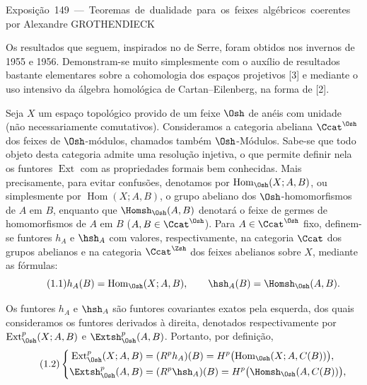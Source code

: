 \unit{Exposição 149 — Teoremas de dualidade para os feixes algébricos coerentes}
%
  {por Alexandre GROTHENDIECK}

Os resultados que seguem, inspirados no 
de Serre, foram obtidos nos invernos de 1955 e 1956. Demonstram-se muito
simplesmente com o auxílio de resultados bastante elementares sobre a cohomologia dos espaços
projetivos [3] e mediante o uso intensivo da álgebra homológica de
Cartan--Eilenberg, na forma de [2].


Seja $X$ um espaço topológico provido de um feixe $\Osh$ de anéis com unidade
(não necessariamente comutativos). Consideramos a categoria abeliana
$\Ccat^{\Osh}$ dos feixes de $\Osh$-módulos, chamados também $\Osh$-Módulos.
Sabe-se que todo objeto desta categoria admite uma resolução injetiva, o que
permite definir nela os funtores $\operatorname{Ext}$ com as propriedades
formais bem conhecidas. Mais precisamente, para evitar confusões,
denotamos por $\operatorname{Hom}_{\Osh}(X;A,B)$, ou simplesmente por
$\operatorname{Hom}(X;A,B)$, o grupo abeliano dos $\Osh$-homomorfismos de $A$
em $B$, enquanto que $\Homsh_{\Osh}(A,B)$ denotará o feixe de germes
de homomorfismos de $A$ em $B$ ($A,B\in\Ccat^{\Osh}$). Para
$A\in\Ccat^{\Osh}$ fixo, definem-se funtores $h_A$ e $\hsh_A$ com valores, respectivamente,
na categoria $\Ccat$ dos grupos abelianos e na categoria
$\Ccat^{\Zsh}$ dos feixes abelianos sobre $X$, mediante as fórmulas:
\begin{equation}\tag{1.1}
  h_A(B)=\operatorname{Hom}_{\Osh}(X;A,B),
  \qquad
  \hsh_A(B)=\Homsh_{\Osh}(A,B).
\end{equation}

Os funtores $h_A$ e $\hsh_A$ são funtores covariantes exatos pela esquerda,
dos quais consideramos os funtores derivados à direita, denotados respectivamente por
$\operatorname{Ext}_{\Osh}^{p}(X;A,B)$ e $\Extsh_{\Osh}^{p}(A,B)$. Portanto,
por definição,
\begin{equation}\tag{1.2}
\left\{
\begin{aligned}
\operatorname{Ext}_{\Osh}^{p}(X;A,B)
  &= (R^{p}h_A)(B)
   = H^{p}\bigl(\operatorname{Hom}_{\Osh}(X;A,C(B))\bigr),\\
\Extsh_{\Osh}^{p}(A,B)
  &= (R^{p}\hsh_A)(B)
   = H^{p}\bigl(\Homsh_{\Osh}(A,C(B))\bigr),
\end{aligned}
\right.
\end{equation}

